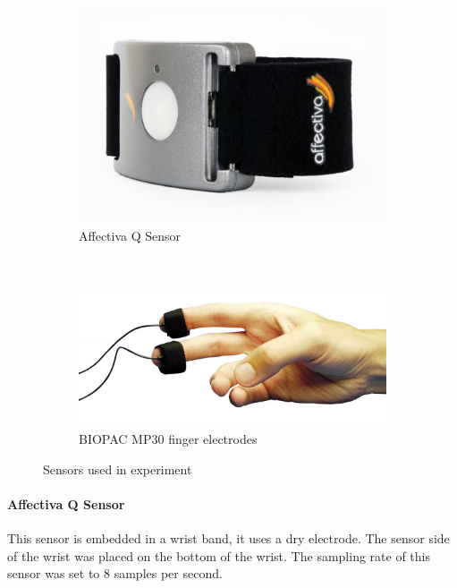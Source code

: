 \documentclass[11pt,leqno,a4paper]{report} %
\begin{document}
\begin{figure}[H]
\hspace*{-.1\textwidth}        \centering
        \begin{subfigure}[b]{0.6\textwidth}
                \includegraphics[width=\textwidth]{affectiva.jpg}
                \caption{Affectiva Q Sensor}
                \label{fig:aff}
        \end{subfigure}%
        ~ %
        \begin{subfigure}[b]{0.6\textwidth}
                \includegraphics[width=\textwidth]{bioelec.jpg}
                \caption{BIOPAC MP30 finger electrodes}
                \label{fig:bio}
        \end{subfigure}
        \caption{Sensors used in experiment}\label{fig:animals}
\end{figure}


\paragraph{Affectiva Q Sensor}
This sensor is embedded in a wrist band, it uses a dry electrode. The sensor side of the wrist was placed on the bottom of the wrist. The sampling rate of this sensor was set to 8 samples per second.
\end{document}
